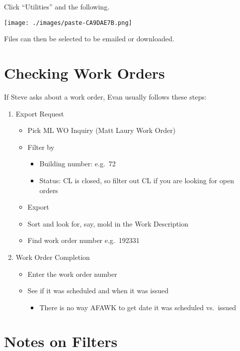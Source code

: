 \documentclass[
  letterpaper,
  DIV=11,
  numbers=noendperiod,
  oneside]{scrreprt}
\providecommand{\tightlist}{%
  \setlength{\itemsep}{0pt}\setlength{\parskip}{0pt}}\usepackage{longtable,booktabs,array}
\begin{document}
Click ``Utilities'' and the following.

\texttt{[image: ./images/paste-CA9DAE7B.png]}

Files can then be selected to be emailed or downloaded.

\hypertarget{checking-work-orders}{%
\section{Checking Work Orders}\label{checking-work-orders}}

If Steve asks about a work order, Evan usually follows these steps:

\begin{enumerate}
\def\labelenumi{\arabic{enumi}.}
\item
  Export Request

  \begin{itemize}
  \item
    Pick ML WO Inquiry (Matt Laury Work Order)
  \item
    Filter by

    \begin{itemize}
    \item
      Building number: e.g.~72
    \item
      Status: CL is closed, so filter out CL if you are looking for open
      orders
    \end{itemize}
  \item
    Export
  \item
    Sort and look for, say, mold in the Work Description
  \item
    Find work order number e.g.~192331
  \end{itemize}
\item
  Work Order Completion

  \begin{itemize}
  \item
    Enter the work order number
  \item
    See if it was scheduled and when it was issued

    \begin{itemize}
    \tightlist
    \item
      There is no way AFAWK to get date it was scheduled vs.~issued
    \end{itemize}
  \end{itemize}
\end{enumerate}

\hypertarget{notes-on-filters}{%
\section{Notes on Filters}\label{notes-on-filters}}
\end{document}
